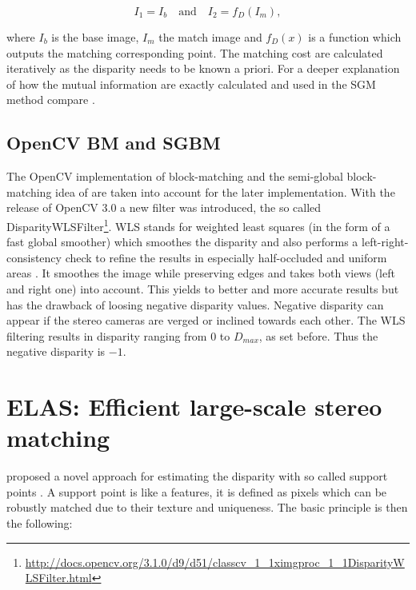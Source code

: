 \begin{equation}
    I_1 = I_b\quad \textrm{and}\quad I_2 = f_D(I_m),
\end{equation}

\noindent where $I_b$ is the base image, $I_m$ the match image and $f_D(x)$ is a function which outputs the matching corresponding point.
The matching cost are calculated iteratively as the disparity needs to be known a priori.
For a deeper explanation of how the mutual information are exactly calculated and used in the SGM method compare \citep{hirschmuller2005accurate, hirschmuller2007evaluation, hirschmuller2008stereo, hirschmuller2011semi}.

\subsection*{OpenCV BM and SGBM}

The OpenCV\citep{opencv_library} implementation of block-matching and the semi-global block-matching idea of \citeauthor{hirschmuller2005accurate} are taken into account for the later implementation.
\newline\newline\noindent With the release of OpenCV 3.0 \citep{opencv_library} a new filter was introduced, the so called DisparityWLSFilter\footnote{\url{http://docs.opencv.org/3.1.0/d9/d51/classcv_1_1ximgproc_1_1DisparityWLSFilter.html}}.
WLS stands for weighted least squares (in the form of a fast global smoother) which smoothes the disparity and also performs a left-right-consistency check to refine the results in especially half-occluded and uniform areas \citep{min2014fast}.
It smoothes the image while preserving edges and takes both views (left and right one) into account.
This yields to better and more accurate results but has the drawback of loosing negative disparity values.
Negative disparity can appear if the stereo cameras are verged or inclined towards each other.
The WLS filtering results in disparity ranging from $0$ to $D_{max}$, as set before.
Thus the negative disparity is $-1$.

\section{ELAS: Efficient large-scale stereo matching}

\citeauthor{Geiger2010ACCV, Geiger2011IV} proposed a novel approach for estimating the disparity with so called support points \citep{Geiger2010ACCV, Geiger2011IV}.
A support point is like a features, it is defined as pixels which can be robustly matched due to their texture and uniqueness.
The basic principle is then the following:

